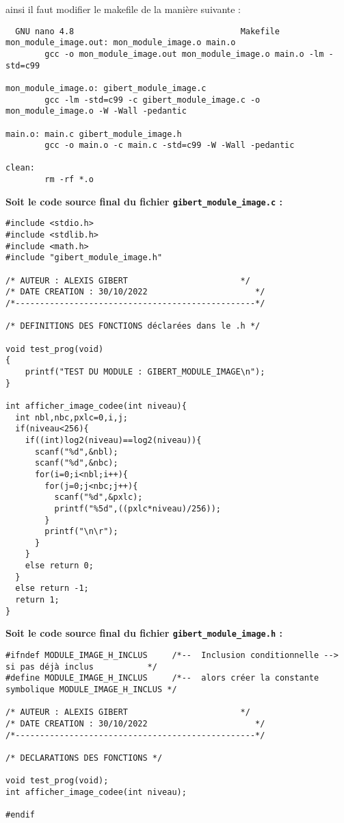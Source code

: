 \documentclass[11pt]{article}
\begin{document}
ainsi il faut modifier le makefile de la manière suivante :

\begin{verbatim}
  GNU nano 4.8                                  Makefile                                             
mon_module_image.out: mon_module_image.o main.o
        gcc -o mon_module_image.out mon_module_image.o main.o -lm -std=c99

mon_module_image.o: gibert_module_image.c
        gcc -lm -std=c99 -c gibert_module_image.c -o mon_module_image.o -W -Wall -pedantic

main.o: main.c gibert_module_image.h
        gcc -o main.o -c main.c -std=c99 -W -Wall -pedantic

clean:
        rm -rf *.o
\end{verbatim}

\textbf{Soit le code source final du fichier
\texttt{gibert\_module\_image.c} :}

\begin{verbatim}
#include <stdio.h>
#include <stdlib.h>
#include <math.h>
#include "gibert_module_image.h"

/* AUTEUR : ALEXIS GIBERT                       */
/* DATE CREATION : 30/10/2022                      */
/*-------------------------------------------------*/

/* DEFINITIONS DES FONCTIONS déclarées dans le .h */

void test_prog(void)
{
    printf("TEST DU MODULE : GIBERT_MODULE_IMAGE\n");
}

int afficher_image_codee(int niveau){
  int nbl,nbc,pxlc=0,i,j;
  if(niveau<256){
    if((int)log2(niveau)==log2(niveau)){
      scanf("%d",&nbl);
      scanf("%d",&nbc);
      for(i=0;i<nbl;i++){
        for(j=0;j<nbc;j++){
          scanf("%d",&pxlc);
          printf("%5d",((pxlc*niveau)/256));
        }
        printf("\n\r");
      }
    }
    else return 0;
  }
  else return -1;
  return 1;
}
\end{verbatim}

\textbf{Soit le code source final du fichier
\texttt{gibert\_module\_image.h} :}

\begin{verbatim}
#ifndef MODULE_IMAGE_H_INCLUS     /*--  Inclusion conditionnelle --> si pas déjà inclus           */
#define MODULE_IMAGE_H_INCLUS     /*--  alors créer la constante symbolique MODULE_IMAGE_H_INCLUS */

/* AUTEUR : ALEXIS GIBERT                       */
/* DATE CREATION : 30/10/2022                      */
/*-------------------------------------------------*/

/* DECLARATIONS DES FONCTIONS */

void test_prog(void);
int afficher_image_codee(int niveau);

#endif
\end{verbatim}
\end{document}
